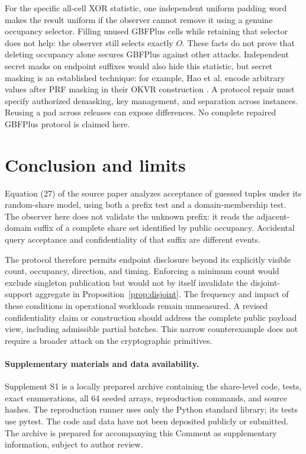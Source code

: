 \documentclass[11pt]{article}
\begin{document}
For the specific all-cell XOR statistic, one independent uniform padding word
makes the result uniform if the observer cannot remove it using a genuine
occupancy selector. Filling unused GBFPlus cells while retaining that selector
does not help: the observer still selects exactly $O$. These facts do not
prove that deleting occupancy alone secures GBFPlus against other attacks.
Independent secret masks on endpoint suffixes would also hide this statistic,
but secret masking is an established technique: for example, Hao et al.
encode arbitrary values after PRF masking in their OKVR construction
\cite{hao2024okvr}. A protocol repair must specify authorized demasking,
key management, and separation across instances. Reusing a pad across releases
can expose differences. No complete repaired GBFPlus protocol is claimed here.

\section{Conclusion and limits}

Equation (27) of the source paper analyzes acceptance of guessed tuples under
its random-share model, using both a prefix test and a domain-membership test.
The observer here
does not validate the unknown prefix: it reads the adjacent-domain suffix of
a complete share set identified by public occupancy. Accidental query acceptance
and confidentiality of that suffix are different events.

The protocol therefore permits endpoint disclosure beyond its explicitly
visible count, occupancy, direction, and timing. Enforcing a minimum count
would exclude singleton publication but would not by itself invalidate the
disjoint-support aggregate in Proposition~\ref{prop:disjoint}. The frequency
and impact of these conditions in operational workloads remain unmeasured.
A revised confidentiality claim or construction should address the complete
public payload view, including admissible partial batches. This narrow
counterexample does not require a broader attack on the cryptographic primitives.

\paragraph{Supplementary materials and data availability.}
Supplement S1 is a locally prepared archive containing the share-level code,
tests, exact enumerations, all 64 seeded arrays, reproduction commands, and
source hashes. The reproduction runner uses only the Python standard library;
its tests use pytest. The code and data have not been deposited publicly or
submitted. The archive is prepared for accompanying this Comment as
supplementary information, subject to author review.
\end{document}
